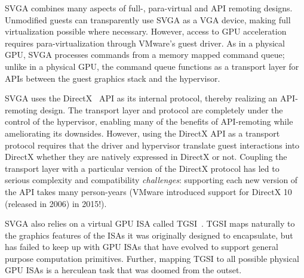 SVGA combines many aspects of full-, para-virtual and API remoting designs.
Unmodified guests can transparently use SVGA as a VGA device, making full
virtualization possible where necessary. However, access to GPU acceleration
requires para-virtualization through VMware's guest driver. As in a physical
GPU, SVGA processes commands from a memory mapped command queue; unlike in a
physical GPU, the command queue functions as a transport layer for APIs
between the guest graphics stack and the hypervisor.

SVGA uses the DirectX~\cite{directX} API as its internal protocol, thereby
realizing an API-remoting design. The transport layer and protocol are
completely under the control of the hypervisor, enabling many of the benefits
of API-remoting while ameliorating its downsides. However, using the DirectX
API as a transport protocol requires that the driver and hypervisor translate
guest interactions into DirectX whether they are natively expressed in DirectX
or not. Coupling the transport layer with a particular version of the DirectX
protocol has led to serious complexity and compatibility \textit{challenges}:
supporting each new version of the API takes many person-years (VMware
introduced support for DirectX 10 (released in 2006) in 2015!).

SVGA also relies on a virtual GPU ISA called TGSI~\cite{tgsi}. TGSI maps
naturally to the graphics features of the ISAs it was originally designed to
encapsulate, but has failed to keep up with GPU ISAs that have evolved to
support general purpose computation primitives. Further, mapping TGSI to all
possible physical GPU ISAs is a herculean task that was doomed from the outset.

